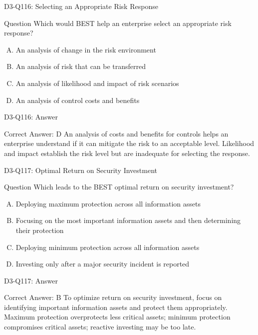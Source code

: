 \documentclass{beamer}
\begin{document}
	\begin{frame}{D3-Q116: Selecting an Appropriate Risk Response}
		\begin{block}{Question}
			Which would BEST help an enterprise select an appropriate risk response?
		\end{block}
		\begin{enumerate}[(A)]
			\item An analysis of change in the risk environment
			\item An analysis of risk that can be transferred
			\item An analysis of likelihood and impact of risk scenarios
			\item An analysis of control costs and benefits
		\end{enumerate}
	\end{frame}
	\begin{frame}{D3-Q116: Answer}
		\begin{block}{Correct Answer: D}
			An analysis of costs and benefits for controls helps an enterprise understand if it can mitigate the risk to an acceptable level. Likelihood and impact establish the risk level but are inadequate for selecting the response.
		\end{block}
	\end{frame}
	
	\begin{frame}{D3-Q117: Optimal Return on Security Investment}
		\begin{block}{Question}
			Which leads to the BEST optimal return on security investment?
		\end{block}
		\begin{enumerate}[(A)]
			\item Deploying maximum protection across all information assets
			\item Focusing on the most important information assets and then determining their protection
			\item Deploying minimum protection across all information assets
			\item Investing only after a major security incident is reported
		\end{enumerate}
	\end{frame}
	\begin{frame}{D3-Q117: Answer}
		\begin{block}{Correct Answer: B}
			To optimize return on security investment, focus on identifying important information assets and protect them appropriately. Maximum protection overprotects less critical assets; minimum protection compromises critical assets; reactive investing may be too late.
		\end{block}
	\end{frame}
	
\end{document}
